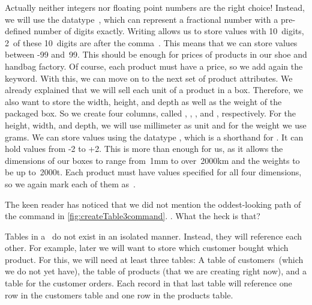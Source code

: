 Actually neither integers nor floating point numbers are the right choice!
Instead, we will use the datatype~, which can represent a fractional number with a pre-defined number of digits exactly.
Writing  allows us to store values with 10~digits, 2~of these 10~digits are after the comma~\cite{PGDG:PD:NT}.
This means that we can store values between -99 and~99.
This should be enough for prices of products in our shoe and handbag factory.
Of course, each product must have a price, so we add again the  keyword.%
%
%
%
With this, we can move on to the next set of product attributes.
We already explained that we will sell each unit of a product in a box.
Therefore, we also want to store the width, height, and depth as well as the weight of the packaged box.
So we create four columns, called , , , and , respectively.
For the height, width, and depth, we will use millimeter as unit and for the weight we use grams.
We can store values using the datatype , which is a shorthand for .
It can hold values from -2 to +2.
This is more than enough for us, as it allows the dimensions of our boxes to range from~1mm to over~2000km and the weights to be up to~2000t.
Each product must have values specified for all four dimensions, so we again mark each of them as~.%
%
\begin{sloppypar}%
The keen reader has noticed that we did not mention the oddest-looking path of the command in \cref{fig:createTable3command}.
.
What the heck is that?%
\end{sloppypar}%
%
Tables in a \db\ do not exist in an isolated manner.
Instead, they will reference each other.
For example, later we will want to store which customer bought which product.
For this, we will need at least three tables:
A table of customers~(which we do not yet have), the table of products (that we are creating right now), and a table for the customer orders.
Each record in that last table will reference one row in the customers table and one row in the products table.

